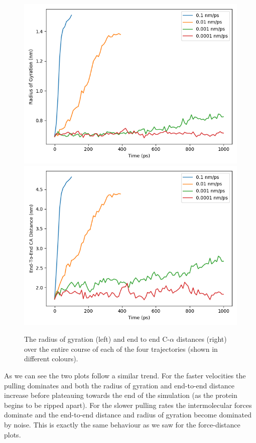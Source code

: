 \documentclass[12pt, onecolumn]{revtex4}    %
\begin{document}
\begin{figure}[h!]
\includegraphics[scale=0.4]{RGYR}
\includegraphics[scale=0.4]{E2E}
\caption{The radius of gyration (left) and end to end C-$\alpha$ distances  (right) over the entire course of each of the four trajectories (shown in different colours).}
\end{figure}

As we can see the two plots follow a similar trend.  For the faster velocities the pulling dominates and both the radius of gyration and end-to-end distance increase before plateauing towards the end of the simulation (as the protein begins to be ripped apart).  For the slower pulling rates the intermolecular forces dominate and the end-to-end distance and radius of gyration become dominated by noise.  This is exactly the same behaviour as we saw for the force-distance plots.\\
\end{document}
